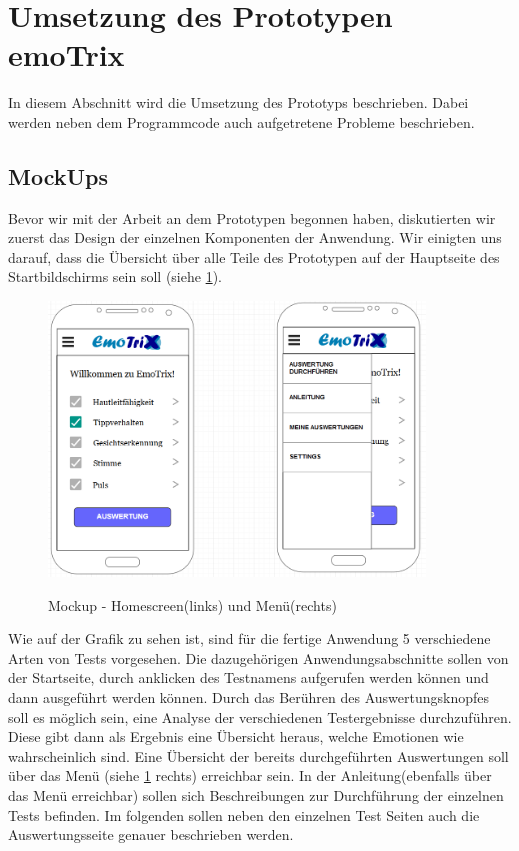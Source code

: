 \section{Umsetzung des Prototypen emoTrix}
In diesem Abschnitt wird die Umsetzung des Prototyps beschrieben. Dabei werden neben dem Programmcode auch aufgetretene Probleme beschrieben.
\subsection{MockUps}
Bevor wir mit der Arbeit an dem Prototypen begonnen haben, diskutierten wir zuerst das Design der einzelnen Komponenten der Anwendung. Wir einigten uns darauf, dass die Übersicht über alle Teile des Prototypen auf der Hauptseite des Startbildschirms sein soll (siehe \ref{img:Mockup-Home}).
\begin{figure}[h]
	\centering
	\includegraphics[width=10cm]{Bilder/Mockup-Home.png}
	\label{img:Mockup-Home}
	\caption[Mockup - Homescreen(links) und Menü(rechts)]{Mockup - Homescreen(links) und Menü(rechts)}
\end{figure}%
Wie auf der Grafik zu sehen ist, sind für die fertige Anwendung 5 verschiedene Arten von Tests vorgesehen. Die dazugehörigen Anwendungsabschnitte sollen von der Startseite, durch anklicken des Testnamens aufgerufen werden können und dann ausgeführt werden können. Durch das Berühren des Auswertungsknopfes soll es möglich sein, eine Analyse der verschiedenen Testergebnisse durchzuführen. Diese gibt dann als Ergebnis eine Übersicht heraus, welche Emotionen wie wahrscheinlich sind. Eine Übersicht der bereits durchgeführten Auswertungen soll über das Menü (siehe \ref{img:Mockup-Home} rechts) erreichbar sein. In der Anleitung(ebenfalls über das Menü erreichbar) sollen sich Beschreibungen zur Durchführung der einzelnen Tests befinden.\newline
Im folgenden sollen neben den einzelnen Test Seiten auch die Auswertungsseite genauer beschrieben werden.
